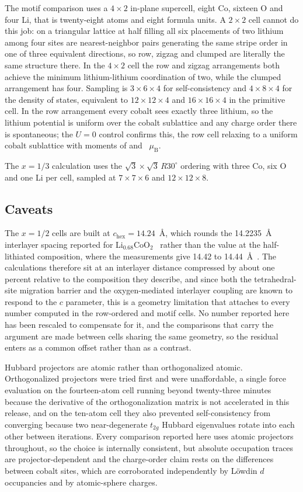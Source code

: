 \documentclass[reprint,twocolumn,prb,amsmath,amssymb,superscriptaddress,floatfix]{revtex4-2}
\newcommand{\muBs}{\mu_{\mathrm{B}}}
\begin{document}
The motif comparison uses a $4\times2$ in-plane supercell, eight Co, sixteen O and four Li, that
is twenty-eight atoms and eight formula units. A $2\times2$ cell cannot do this job: on a
triangular lattice at half filling all six placements of two lithium among four sites are
nearest-neighbor pairs generating the same stripe order in one of three equivalent directions,
so row, zigzag and clumped are literally the same structure there. In the $4\times2$ cell the
row and zigzag arrangements both achieve the minimum lithium-lithium coordination of two, while
the clumped arrangement has four. Sampling is $3\times6\times4$ for self-consistency and
$4\times8\times4$ for the density of states, equivalent to $12\times12\times4$ and
$16\times16\times4$ in the primitive cell. In the row arrangement every cobalt sees
exactly three lithium, so the lithium potential is uniform over the cobalt sublattice and any
charge order there is spontaneous; the $U=0$ control confirms this, the row cell relaxing to a
uniform cobalt sublattice with moments of \momentRowUzeroA{} and \momentRowUzeroB~$\muBs$.

The $x=1/3$ calculation uses the $\sqrt3\times\sqrt3\,R30^{\circ}$ ordering with three Co, six O
and one Li per cell, sampled at $7\times7\times6$ and $12\times12\times8$.

\subsection{Caveats}

The $x=1/2$ cells are built at $c_{\mathrm{hex}}=14.24$~\AA, which rounds the 14.2235~\AA{}
interlayer spacing reported for Li$_{0.68}$CoO$_{2}$~\cite{Takahashi2007} rather than the value at
the half-lithiated composition, where the measurements give 14.42 to
14.44~\AA~\cite{Reimers1992,Motohashi2009}. The calculations
therefore sit at an interlayer distance compressed by about one percent relative to the
composition they describe, and since both the tetrahedral-site migration barrier and the
oxygen-mediated interlayer coupling are known to respond to the $c$ parameter, this is a
geometry limitation that attaches to every number computed in the row-ordered and motif cells.
No number reported here has been rescaled to compensate for it, and the comparisons that carry
the argument are made between cells sharing the same geometry, so the residual enters as a
common offset rather than as a contrast.

Hubbard projectors are atomic rather than orthogonalized atomic. Orthogonalized projectors were
tried first and were unaffordable, a single force evaluation on the fourteen-atom cell running
beyond twenty-three minutes because the derivative of the orthogonalization matrix is not
accelerated in this release, and on the ten-atom cell they also prevented self-consistency from
converging because two near-degenerate $t_{2g}$ Hubbard eigenvalues rotate into each other
between iterations. Every comparison reported here uses atomic projectors throughout, so the
choice is internally consistent, but absolute occupation traces are projector-dependent and the
charge-order claim rests on the differences between cobalt sites, which are corroborated
independently by L\"owdin $d$ occupancies and by atomic-sphere charges.
\end{document}
